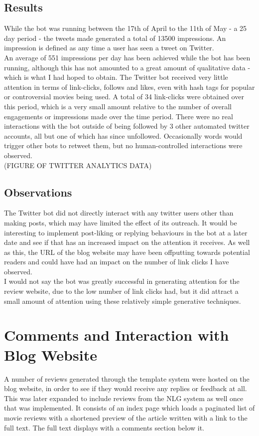 \subsection{Results}
While the bot was running between the 17th of April to the 11th of May - a 25 day period - the tweets made generated a total of 13500 impressions. An impression is defined as any time a user has seen a tweet on Twitter.\\
An average of 551 impressions per day has been achieved while the bot has been running, although this has not amounted to a great amount of qualitative data - which is what I had hoped to obtain. The Twitter bot received very little attention in terms of link-clicks, follows and likes, even with hash tags for popular or controversial movies being used. A total of 34 link-clicks were obtained over this period, which is a very small amount relative to the number of overall engagements or impressions made over the time period. There were no real interactions with the bot outside of being followed by 3 other automated twitter accounts, all but one of which has since unfollowed. Occasionally words would trigger other bots to retweet them, but no human-controlled interactions were observed. \\
(FIGURE OF TWITTER ANALYTICS DATA)

\subsection{Observations}
The Twitter bot did not directly interact with any twitter users other than making posts, which may have limited the effect of its outreach. It would be interesting to implement post-liking or replying behaviours in the bot at a later date and see if that has an increased impact on the attention it receives. As well as this, the URL of the blog website may have been offputting towards potential readers and could have had an impact on the number of link clicks I have observed.\\
I would not say the bot was greatly successful in generating attention for the review website, due to the low number of link clicks had, but it did attract a small amount of attention using these relatively simple generative techniques.


\section{Comments and Interaction with Blog Website}
A number of reviews generated through the template system were hosted on the blog website, in order to see if they would receive any replies or feedback at all. This was later expanded to include reviews from the NLG system as well once that was implemented. It consists of an index page which loads a paginated list of movie reviews with a shortened preview of the article written with a link to the full text. The full text displays with a comments section below it.

